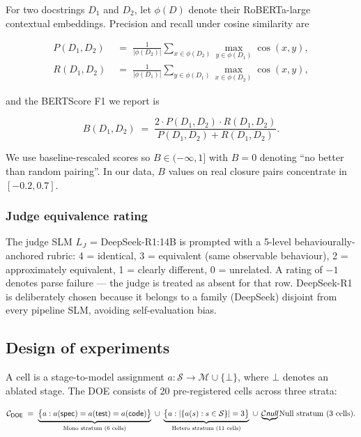 For two docstrings $D_1$ and $D_2$, let $\phi(D)$ denote their RoBERTa-large contextual embeddings. Precision and recall under cosine similarity are

\begin{align}
  P(D_1, D_2) &\;=\; \tfrac{1}{|\phi(D_2)|} \textstyle\sum_{x \in \phi(D_2)} \max_{y \in \phi(D_1)} \cos(x, y), \label{eq:bert_p}\\
  R(D_1, D_2) &\;=\; \tfrac{1}{|\phi(D_1)|} \textstyle\sum_{y \in \phi(D_1)} \max_{x \in \phi(D_2)} \cos(x, y), \label{eq:bert_r}
\end{align}

and the BERTScore F1 we report is

\begin{equation}
  B(D_1, D_2)
  \;=\;
  \frac{2 \cdot P(D_1, D_2) \cdot R(D_1, D_2)}{P(D_1, D_2) + R(D_1, D_2)}.
  \label{eq:bertscore}
\end{equation}

We use baseline-rescaled scores so $B \in (-\infty, 1]$ with $B = 0$ denoting ``no better than random pairing''. In our data, $B$ values on real closure pairs concentrate in $[-0.2, 0.7]$.

\subsubsection{Judge equivalence rating}

The judge SLM $L_J$ = DeepSeek-R1:14B is prompted with a 5-level behaviourally-anchored rubric: 4 = identical, 3 = equivalent (same observable behaviour), 2 = approximately equivalent, 1 = clearly different, 0 = unrelated. A rating of $-1$ denotes parse failure --- the judge is treated as absent for that row. DeepSeek-R1 is deliberately chosen because it belongs to a family (DeepSeek) disjoint from every pipeline SLM, avoiding self-evaluation bias.

\subsection{Design of experiments}

A cell is a stage-to-model assignment $a : \mathcal{S} \to \mathcal{M} \cup \{\bot\}$, where $\bot$ denotes an ablated stage. The DOE consists of 20 pre-registered cells across three strata:

\begin{equation}
  \mathcal{C}_{\textsf{DOE}} \;=\;
  \underbrace{\bigl\{a : a(\textsf{spec}) = a(\textsf{test}) = a(\textsf{code})\bigr\}}_{\text{Mono stratum (6 cells)}}
  \;\cup\;
  \underbrace{\bigl\{a : |\{a(s) : s \in \mathcal{S}\}| = 3\bigr\}}_{\text{Hetero stratum (11 cells)}}
  \;\cup\;
  \underbrace{\mathcal{C}\emph{{\textsf{null}}}}{\text{Null stratum (3 cells)}}.
  \label{eq:doe}
\end{equation}

